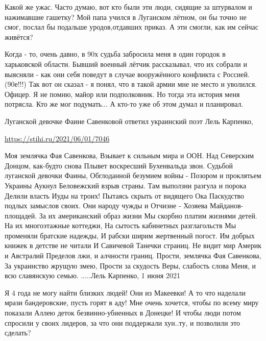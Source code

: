 \begin{itemize}

Какой же ужас. Часто думаю, вот кто были эти люди, сидящие за штурвалом и
нажимавшие гашетку? Мой папа учился в Луганском лётном, он бы точно не смог,
послал бы подальше уродов,отдавших приказ. А эти смогли, как им сейчас живётся?


Когда - то, очень давно, в 90х судьба забросила меня в один городок в
харьковской области. Бывший военный лётчик рассказывал, что их собрали и
выясняли - как они себя поведут в случае вооружённого конфликта с Россией.
(90е!!!) Так вот он сказал - я понял, что в такой армии мне не место и
уволился. Офицер. Я не помню, майор или подполковник. Но тогда эта история меня
потрясла. Кто же мог подумать... А кто-то уже об этом думал и планировал.


Луганской девочке Фаине Савенковой ответил украинский поэт Лель Карпенко,\par
\url{https://stihi.ru/2021/06/01/7046}

\obeycr
Моя землячка Фая Савенкова,
Взывает к сильным мира и ООН.
Над Северским Донцом, как-будто снова
Плывет воскресший Бухенвальда звон.
Судьбой луганской девочки Фаины,
Обглоданной безумием войны -
Позором и проклятьем Украины
Аукнул Беловежский взрыв страны.
Там выползни разгула и порока
Делили власть Иуды на троих!
Пытаясь скрыть от видящего Ока
Паскудство подлых замыслов своих.
Они народу чужды и Отчизне -
Хозяева Майданов-площадей.
За их американский образ жизни
Мы скорбно платим жизнями детей.
На их многоэтажные коттеджи,
На сытость кабинетных разглагольств
Мы променяли братские надежды,
И рабски ширим жертвенный погост.
Им добрых книжек в детстве не читали
И Савичевой Танечки страниц.
Не видит мир Америк и Австралий
Пределов лжи, и алчности границ.
Прости, землячка Фая Савенкова,
За украинство жрущую змею,
Прости за скудость Веры, слабость слова
Меня, и всю славянскую семью.
.....Лель Карпенко, 1 июня 2021
\restorecr


Я 4 года не могу найти близких людей! Они из Макеевки! А то что наделали мрази
бандеровские, пусть горят в аду! Мне очень хочется, чтобы по всему миру показали
Аллею деток безвинно-убиенных в Донецке! И чтобы люди потом спросили у своих
лидеров, за что они поддержали хун..ту, и позволили это сделать?



\end{itemize}
